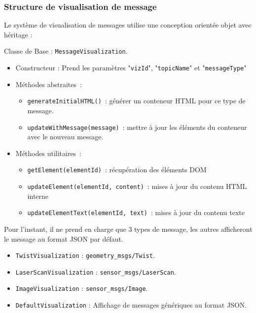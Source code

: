 \documentclass{name}
\begin{document}
\subsubsection{Structure de visualisation de message}

Le système de visualisation de messages utilise une conception orientée objet avec héritage :

Classe de Base : \texttt{MessageVisualization}. 

\begin{itemize}
    \item Constructeur : Prend les paramètres "\texttt{vizId}", "\texttt{topicName}" et "\texttt{messageType}"
    \item Méthodes abstraites :
    \begin{itemize}
        \item \texttt{generateInitialHTML()} : générer un conteneur HTML pour ce type de message.
        \item \texttt{updateWithMessage(message)} : mettre à jour les éléments du conteneur avec le nouveau message.
    \end{itemize}
    \item Méthodes utilitaires :
    \begin{itemize}
        \item \texttt{getElement(elementId)} : récupération des éléments DOM
        \item \texttt{updateElement(elementId, content)} : mises à jour du contenu HTML interne
        \item \texttt{updateElementText(elementId, text)} : mises à jour du contenu texte
    \end{itemize}
\end{itemize}

Pour l'instant, il ne prend en charge que 3 types de message, les autres afficheront le message au format JSON par défaut.

\begin{itemize}
    \item \texttt{TwistVisualization} : \texttt{geometry\_msgs/Twist}.
    \item \texttt{LaserScanVisualization} : \texttt{sensor\_msgs/LaserScan}.
    \item \texttt{ImageVisualization} : \texttt{sensor\_msgs/Image}.
    \item \texttt{DefaultVisualization} : Affichage de messages génériques au format JSON.
\end{itemize}
\end{document}
